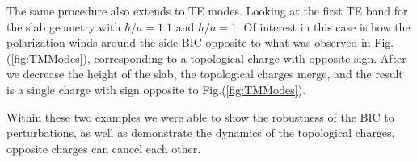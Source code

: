 \begin{figure}
\begin{minipage}{0.5\textwidth}
  \label{fig:TMModes_change}
\end{minipage}
\end{figure}


The same procedure also extends to TE modes. Looking at the first TE band for the slab geometry with $h/a=1.1$ and $h/a=1$. Of interest in this case is how the polarization winds around the side BIC opposite to what was observed in Fig.(\ref{fig:TMModes}), corresponding to a topological charge with opposite sign. After we decrease the height of the slab, the topological charges merge, and the result is a single charge with sign opposite to Fig.(\ref{fig:TMModes}).

Within these two examples we were able to show the robustness of the BIC to perturbations, as well as demonstrate the dynamics of the topological charges, opposite charges can cancel each other.

